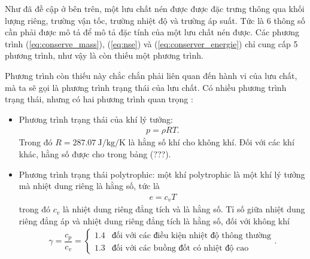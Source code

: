\documentclass[../../../main.tex]{subfiles}
\begin{document}
    Như đã đề cập ở bên trên, một lưu chất nén được được đặc trưng thông qua khối lượng riêng, trường vận tốc, trường nhiệt độ và trường áp suất. Tức là 6 thông số cần phải được mô tả để mô tả đặc tính của một lưu chất nén được. Các phương trình (\ref{eq:conserve_mass}), (\ref{eq:nse}) và (\ref{eq:conserver_energie}) chỉ cung cấp 5 phương trình, như vậy là còn thiếu một phương trình.

    Phương trình còn thiếu này chắc chắn phải liên quan đến hành vi của lưu chất, mà ta sẽ gọi là phương trình trạng thái của lưu chất. Có nhiều phương trình trạng thái, nhưng có hai phương trình quan trọng :
        \begin{itemize}
            \item Phương trình trạng thái của khí lý tưởng:
                \begin{align}
                    p = \rho RT.
                \end{align}
            Trong đó $R=\SI{287.07}{\joule\per\kilogram\per\kelvin}$ là hằng số khí cho không khí. Đối với các khí khác, hằng số được cho trong bảng (???).
            \item Phương trình trạng thái polytrophic: một khí polytrophic là một khí lý tưởng mà nhiệt dung riêng là hằng số, tức là
                \begin{align}
                    e = c_vT
                \end{align}
            trong đó $c_v$ là nhiệt dung riêng đẳng tích và là hằng số. Tỉ số giữa nhiệt dung riêng đẳng áp và nhiệt dung riêng đẳng tích là hằng số, đối với không khí
                \begin{align}
                    \gamma = \dfrac{c_p}{c_v} = \begin{cases}
                        1.4 & \text{đối với các điều kiện nhiệt độ thông thường}\\
                        1.3 & \text{đối với các buồng đốt có nhiệt độ cao}
                    \end{cases}.
                \end{align}
        \end{itemize}
\end{document}
